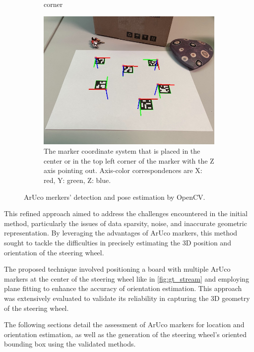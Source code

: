 \begin{figure}[ht]
\begin{subfigure}[t]{0.3\textwidth}
{        corner}
        \label{fig:marker_detection}
    \end{subfigure}\hfill
    \begin{subfigure}[t]{0.3\textwidth}
        \centering
        \includegraphics[width=\textwidth]{media/chapter 5/singlemarkersaxes.jpg}
        \caption{The marker coordinate system that is placed in the center or in the top left 
        corner of the marker with the Z axis pointing out. 
        Axis-color correspondences are X: red, Y: green, Z: blue.}
        \label{fig:marker_orientation}
    \end{subfigure}
    \caption{ArUco merkers' detection and pose estimation by OpenCV.}
\end{figure}

This refined approach aimed to address the challenges 
encountered in the initial method, particularly the issues of 
data sparsity, noise, and inaccurate geometric representation. 
By leveraging the advantages of ArUco markers, this method 
sought to tackle the difficulties in precisely estimating the 
3D position and orientation of the steering wheel. 

The proposed technique involved positioning a board with 
multiple ArUco markers at the center of the steering wheel 
like in \cref{fig:gt_stream} and employing plane fitting to 
enhance the accuracy of orientation estimation. 
This approach was extensively evaluated to validate its 
reliability in capturing the 3D geometry of the steering wheel.

The following sections detail 
the assessment of ArUco markers for location and orientation 
estimation, as well as the generation of the steering wheel's 
oriented bounding box using the validated methods.

